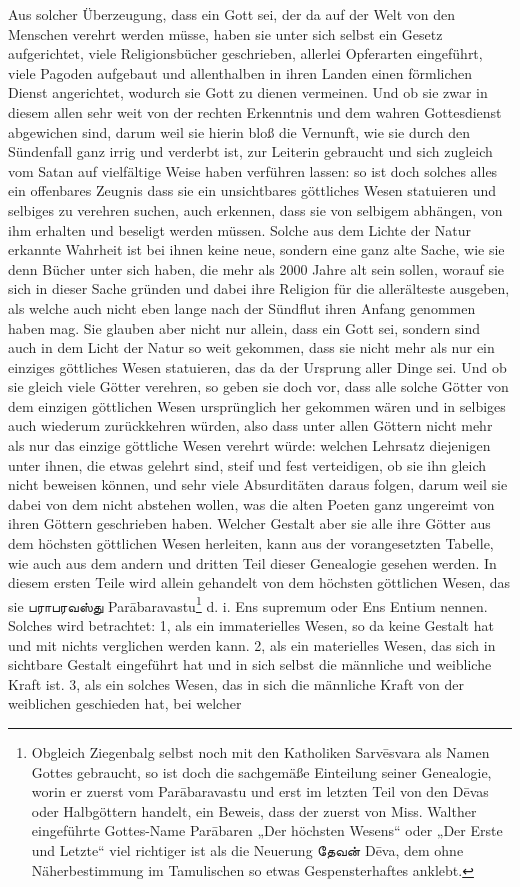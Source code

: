 \documentclass{article}
\newcommand{\TamilText}[1]{\texttamil{#1}}
\newcommand{\tam}[1]{\TamilText{#1}}
\begin{document}
Aus solcher Überzeugung, dass ein Gott sei, der da auf der Welt von den Menschen verehrt werden müsse, haben sie unter sich selbst ein Gesetz aufgerichtet, viele Religionsbücher geschrieben, allerlei Opferarten eingeführt, viele Pagoden aufgebaut und allenthalben in ihren Landen einen förmlichen Dienst angerichtet, wodurch sie Gott zu dienen vermeinen. Und ob sie zwar in diesem allen sehr weit von der rechten Erkenntnis und dem wahren Gottesdienst abgewichen sind, darum weil sie hierin bloß die Vernunft, wie sie durch den Sündenfall ganz irrig und verderbt ist, zur Leiterin gebraucht und sich zugleich vom Satan auf vielfältige Weise haben verführen lassen: so ist doch solches alles ein offenbares Zeugnis dass sie ein unsichtbares göttliches Wesen statuieren und selbiges zu verehren suchen, auch erkennen, dass sie von selbigem abhängen, von ihm erhalten und beseligt werden müssen. Solche aus dem Lichte der Natur erkannte Wahrheit ist bei ihnen keine neue, sondern eine ganz alte Sache, wie sie denn Bücher unter sich haben, die mehr als 2000 Jahre alt sein sollen, worauf sie sich in dieser Sache gründen und dabei ihre Religion für die allerälteste ausgeben, als welche auch nicht eben lange nach der Sündflut ihren Anfang genommen haben mag. Sie glauben aber nicht nur allein, dass ein Gott sei, sondern sind auch in dem Licht der Natur so weit gekommen, dass sie nicht mehr als nur ein einziges göttliches Wesen statuieren, das da der Ursprung aller Dinge sei. Und ob sie gleich viele Götter verehren, so geben sie doch vor, dass alle solche Götter von dem einzigen göttlichen Wesen ursprünglich her gekommen wären und in selbiges auch wiederum zurückkehren würden, also dass unter allen Göttern nicht mehr als nur das einzige göttliche Wesen verehrt würde: welchen Lehrsatz diejenigen unter ihnen, die etwas gelehrt sind, steif und fest verteidigen, ob sie ihn gleich nicht beweisen können, und sehr viele Absurditäten daraus folgen, darum weil sie dabei von dem nicht abstehen wollen, was die alten Poeten ganz ungereimt von ihren Göttern geschrieben haben. Welcher Gestalt aber sie alle ihre Götter aus dem höchsten göttlichen Wesen herleiten, kann aus der vorangesetzten Tabelle, wie auch aus dem andern und dritten Teil dieser Genealogie gesehen werden. In diesem ersten Teile wird allein gehandelt von dem höchsten göttlichen Wesen, das sie \tam{பராபரவஸ்து} Par\={a}baravastu\footnote{Obgleich Ziegenbalg selbst noch mit den Katholiken Sarv\={e}svara als Namen Gottes gebraucht, so ist doch die sachgemäße Einteilung seiner Genealogie, worin er zuerst vom Par\={a}baravastu und erst im letzten Teil von den D\={e}vas oder Halbgöttern handelt, ein Beweis, dass der zuerst von Miss. Walther eingeführte Gottes-Name Par\={a}baren „Der höchsten Wesens“ oder „Der Erste und Letzte“ viel richtiger ist als die Neuerung \tam{தேவன்} D\={e}va, dem ohne Näherbestimmung im Tamulischen so etwas Gespensterhaftes anklebt.} d. i. Ens supremum oder Ens Entium nennen. Solches wird betrachtet: 1, als ein immaterielles Wesen, so da keine Gestalt hat und mit nichts verglichen werden kann. 2, als ein materielles Wesen, das sich in sichtbare Gestalt eingeführt hat und in sich selbst die männliche und weibliche Kraft ist. 3, als ein solches Wesen, das in sich die männliche Kraft von der weiblichen geschieden hat, bei welcher 
\end{document}
